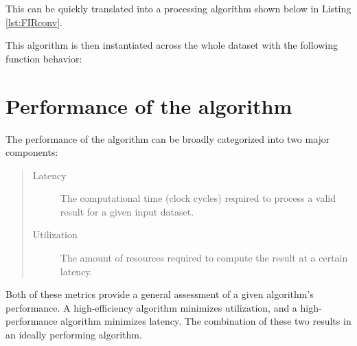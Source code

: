 \documentclass[11pt]{report}
\begin{document}
This can be quickly translated into a processing algorithm shown below in Listing \ref{lst:FIRconv}.
\begin{quote}
\begin{singlespace}
    
\end{singlespace}
\end{quote}

This algorithm is then instantiated across the whole dataset with the following function behavior:

\begin{quote}
\begin{singlespace}
    
\end{singlespace}
\end{quote}


\section{Performance of the algorithm}
The performance of the algorithm can be broadly categorized into two major components:

\begin{quote}
\begin{description}
	\item [Latency] The computational time (clock cycles) required to process a valid result for a given input dataset.
	\item [Utilization] The amount of resources required to compute the result at a certain latency.
\end{description}
\end{quote}

Both of these metrics provide a general assessment of a given algorithm's performance. A high-efficiency algorithm minimizes utilization, and a high-performance algorithm minimizes latency. The combination of these two results in an ideally performing algorithm.
\end{document}
